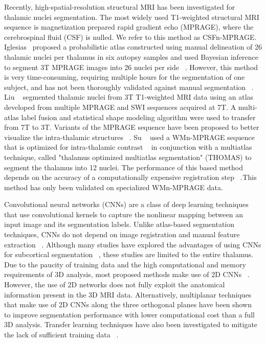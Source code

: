 Recently, high-spatial-resolution structural MRI has been investigated for thalamic nuclei segmentation. The most widely used T1-weighted structural MRI sequence is magnetization prepared rapid gradient echo (MPRAGE), where the cerebrospinal fluid (CSF) is nulled. We refer to this method as CSFn-MPRAGE. Iglesias\unskip~\cite{1643371:26789917} proposed a probabilistic atlas constructed using manual delineation of 26 thalamic nuclei per thalamus in six autopsy samples and used Bayesian inference to segment 3T MPRAGE images into 26 nuclei per side \unskip~\cite{1643371:26789932,1643371:26789914}. However, this method is very time-consuming, requiring multiple hours for the segmentation of one subject, and has not been thoroughly validated against manual segmentation \unskip~\cite{1643371:26789917}. Liu \unskip~\cite{1643371:26789952} segmented thalamic nuclei from 3T T1-weighted MRI data using an atlas developed from multiple MPRAGE and SWI sequences acquired at 7T. A multi-atlas label fusion and statistical shape modeling algorithm were used to transfer from 7T to 3T. Variants of the MPRAGE sequence have been proposed to better visualize the intra-thalamic structures \unskip~\cite{1643371:26789957,1643371:26789954}. Su \unskip~\cite{1643371:26789960} used a WMn-MPRAGE sequence that is optimized for intra-thalamic contrast \unskip~\cite{1643371:26789961} in conjunction with a multiatlas technique, called "thalamus optimized multiatlas segmentation" (THOMAS) to segment the thalamus into 12 nuclei. The performance of this based method depends on the accuracy of a computationally expensive registration step \unskip~\cite{1643371:26789917,1643371:26789939}.\ensuremath{^{}}This method has only been validated on specialized WMn-MPRAGE data.

Convolutional neural networks (CNNs) are a class of deep learning techniques that use convolutional kernels to capture the nonlinear mapping between an input image and its segmentation labels. Unlike atlas-based segmentation techniques, CNNs do not depend on image registration and manual feature extraction \unskip~\cite{1643371:26789908}. Although many studies have explored the advantages of using CNNs for subcortical segmentation \unskip~\cite{1643371:26789955,1643371:26789913,1643371:26789947,1643371:26789902}, these studies are limited to the entire thalamus. Due to the paucity of training data and the high computational and memory requirements of 3D analysis, most proposed methods make use of 2D CNNs \unskip~\cite{1643371:26789947}. However, the use of 2D networks does not fully exploit the anatomical information present in the 3D MRI data. Alternatively, multiplanar techniques that make use of 2D CNNs along the three orthogonal planes have been shown \unskip~\cite{1643371:26789913,1643371:26789921,1643371:26789904,1643371:26789950}\ensuremath{^{}}to improve segmentation performance with lower computational cost than a full 3D analysis. Transfer learning techniques have also been investigated to mitigate the lack of sufficient training data \unskip~\cite{1643371:26789942}.

